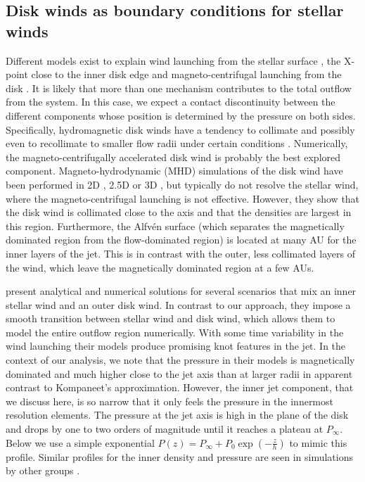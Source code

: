 \subsection{Disk winds as boundary conditions for stellar winds}
\label{sect:boundary}
Different models exist to explain wind launching from the stellar surface \citep{1988ApJ...332L..41K,2005ApJ...632L.135M}, the X-point close to the inner disk edge \citep{1994ApJ...429..781S} and magneto-centrifugal launching from the disk \citep{1982MNRAS.199..883B,2005ApJ...630..945A}. It is likely that more than one mechanism contributes to the total outflow from the system. In this case, we expect a contact discontinuity between the different components whose position is determined by the pressure on both sides. Specifically, hydromagnetic disk winds have a tendency to collimate and possibly even to recollimate to smaller flow radii under certain conditions \citep{1982MNRAS.199..883B,1992ApJ...394..117P}.
Numerically, the magneto-centrifugally accelerated disk wind is probably the best explored component. Magneto-hydrodynamic (MHD) simulations of the disk wind have been performed in 2D \citep[e.g.][]{2005ApJ...630..945A}, 2.5D \citep[e.g.][]{2011ApJ...728L..11R} or 3D \citep[e.g.][]{2006ApJ...653L..33A}, but typically do not resolve the stellar wind, where the magneto-centrifugal launching is not effective. However, they show that the disk wind is collimated close to the axis and that the densities are largest in this region. Furthermore, the Alfv\'en surface (which separates the magnetically dominated region from the flow-dominated region) is located at many AU for the inner layers of the jet. This is in contrast with the outer, less collimated layers of the wind, which leave the magnetically dominated region at a few AUs.

\citet{2009A&A...502..217M} present analytical and numerical solutions for several scenarios that mix an inner stellar wind and an outer disk wind. In contrast to our approach, they impose a smooth transition between stellar wind and disk wind, which allows them to model the entire outflow region numerically. With some time variability in the wind launching their models produce promising knot features in the jet. In the context of our analysis, we note that the pressure in their models is magnetically dominated and much higher close to the jet axis than at larger radii in apparent contrast to Kompaneet's approximation. However, the inner jet component, that we discuss here, is so narrow that it only feels the pressure in the innermost resolution elements. The pressure at the jet axis is high in the plane of the disk and drops by one to two orders of magnitude until it reaches a plateau at $P_\infty$. Below we use a simple exponential $P(z)=P_\infty+P_0\exp\left(-\frac{z}{h}\right)$ to mimic this profile.
Similar profiles for the inner density and pressure are seen in simulations by other groups \citep[e.g.][]{2005ApJ...630..945A,Li_Krasnopolsky_Blandford_2006,2008ApJ...678.1109M}.

